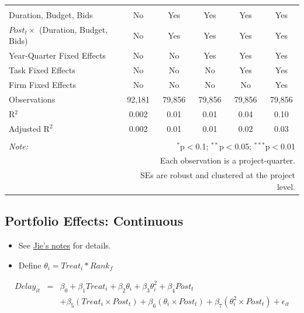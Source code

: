 \documentclass[]{article}
\providecommand{\tightlist}{%
  \setlength{\itemsep}{0pt}\setlength{\parskip}{0pt}}
\begin{document}
\begin{table}[H]
\begin{tabular}{@{\extracolsep{-2pt}}lccccc}
  & & & & & \\ 
\hline \\[-1.8ex] 
Duration, Budget, Bids & No & Yes & Yes & Yes & Yes \\ 
$Post_t \times$  (Duration, Budget, Bids) & No & Yes & Yes & Yes & Yes \\ 
Year-Quarter Fixed Effects & No & No & Yes & Yes & Yes \\ 
Task Fixed Effects & No & No & No & Yes & Yes \\ 
Firm Fixed Effects & No & No & No & No & Yes \\ 
Observations & 92,181 & 79,856 & 79,856 & 79,856 & 79,856 \\ 
R$^{2}$ & 0.002 & 0.01 & 0.01 & 0.04 & 0.10 \\ 
Adjusted R$^{2}$ & 0.002 & 0.01 & 0.01 & 0.02 & 0.03 \\ 
\hline 
\hline \\[-1.8ex] 
\textit{Note:}  & \multicolumn{5}{r}{$^{*}$p$<$0.1; $^{**}$p$<$0.05; $^{***}$p$<$0.01} \\ 
 & \multicolumn{5}{r}{Each observation is a project-quarter.} \\ 
 & \multicolumn{5}{r}{SEs are robust and clustered at the project level.} \\ 
\end{tabular} 
\end{table}

\hypertarget{portfolio-effects-continuous}{%
\subsection{Portfolio Effects:
Continuous}\label{portfolio-effects-continuous}}

\begin{itemize}
\tightlist
\item
  See
  \href{https://github.com/QuickPay-Operational-Performance/Data-and-code/blob/master/notes/Portfolio\%20model\%2B0308.pdf}{Jie's
  notes} for details.
\item
  Define \(\theta_i = Treat_i*Rank_f\)
\end{itemize}

\[ \begin{aligned} Delay_{it} &=& \beta_0+\beta_1 Treat_i + \beta_2 \theta_i+\beta_3 \theta_i^2+\beta_4 Post_t\\&& + \beta_5 (Treat_i\times Post_t) + \beta_6 (\theta_i\times Post_t) +\beta_7 (\theta_i^2\times Post_t)+\epsilon_{it} \end{aligned} \]
\end{document}
